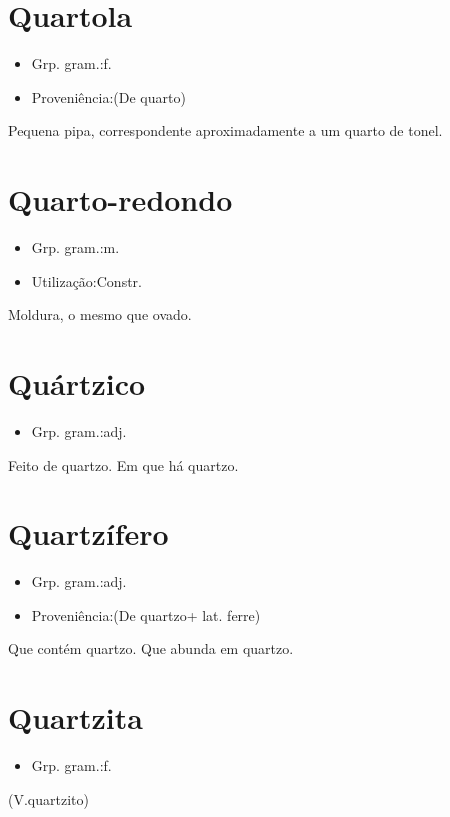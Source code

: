 \section{Quartola}
\begin{itemize}
\item {Grp. gram.:f.}
\end{itemize}
\begin{itemize}
\item {Proveniência:(De \textunderscore quarto\textunderscore )}
\end{itemize}
Pequena pipa, correspondente aproximadamente a um quarto de tonel.
\section{Quarto-redondo}
\begin{itemize}
\item {Grp. gram.:m.}
\end{itemize}
\begin{itemize}
\item {Utilização:Constr.}
\end{itemize}
Moldura, o mesmo que \textunderscore ovado\textunderscore .
\section{Quártzico}
\begin{itemize}
\item {Grp. gram.:adj.}
\end{itemize}
Feito de quartzo.
Em que há quartzo.
\section{Quartzífero}
\begin{itemize}
\item {Grp. gram.:adj.}
\end{itemize}
\begin{itemize}
\item {Proveniência:(De \textunderscore quartzo\textunderscore  + lat. \textunderscore ferre\textunderscore )}
\end{itemize}
Que contém quartzo.
Que abunda em quartzo.
\section{Quartzita}
\begin{itemize}
\item {Grp. gram.:f.}
\end{itemize}
(V.quartzito)
